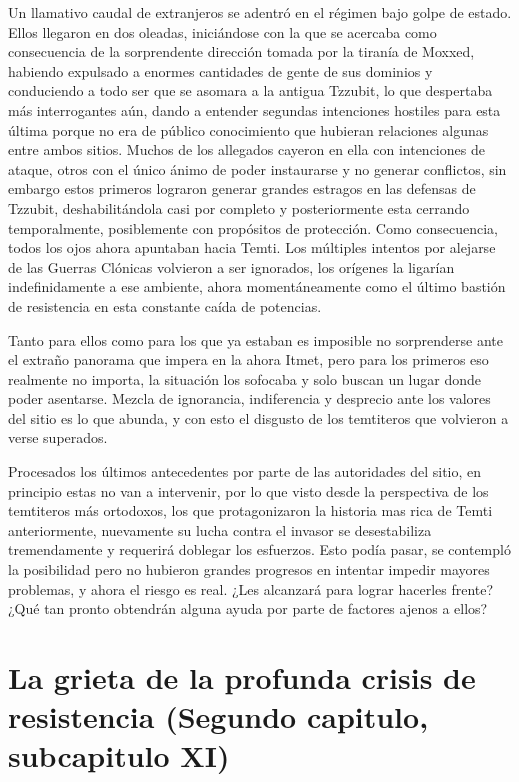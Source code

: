\documentclass[
  spanish,
]{book}
\begin{document}
Un llamativo caudal de extranjeros se adentró en el régimen bajo golpe de estado. Ellos llegaron en dos oleadas, iniciándose con la que se acercaba como consecuencia de la sorprendente dirección tomada por la tiranía de Moxxed, habiendo expulsado a enormes cantidades de gente de sus dominios y conduciendo a todo ser que se asomara a la antigua Tzzubit, lo que despertaba más interrogantes aún, dando a entender segundas intenciones hostiles para esta última porque no era de público conocimiento que hubieran relaciones algunas entre ambos sitios.
Muchos de los allegados cayeron en ella con intenciones de ataque, otros con el único ánimo de poder instaurarse y no generar conflictos, sin embargo estos primeros lograron generar grandes estragos en las defensas de Tzzubit, deshabilitándola casi por completo y posteriormente esta cerrando temporalmente, posiblemente con propósitos de protección. Como consecuencia, todos los ojos ahora apuntaban hacia Temti. Los múltiples intentos por alejarse de las Guerras Clónicas volvieron a ser ignorados, los orígenes la ligarían indefinidamente a ese ambiente, ahora momentáneamente como el último bastión de resistencia en esta constante caída de potencias.

Tanto para ellos como para los que ya estaban es imposible no sorprenderse ante el extraño panorama que impera en la ahora Itmet, pero para los primeros eso realmente no importa, la situación los sofocaba y solo buscan un lugar donde poder asentarse. Mezcla de ignorancia, indiferencia y desprecio ante los valores del sitio es lo que abunda, y con esto el disgusto de los temtiteros que volvieron a verse superados.

Procesados los últimos antecedentes por parte de las autoridades del sitio, en principio estas no van a intervenir, por lo que visto desde la perspectiva de los temtiteros más ortodoxos, los que protagonizaron la historia mas rica de Temti anteriormente, nuevamente su lucha contra el invasor se desestabiliza tremendamente y requerirá doblegar los esfuerzos. Esto podía pasar, se contempló la posibilidad pero no hubieron grandes progresos en intentar impedir mayores problemas, y ahora el riesgo es real. ¿Les alcanzará para lograr hacerles frente? ¿Qué tan pronto obtendrán alguna ayuda por parte de factores ajenos a ellos?

\hypertarget{la-grieta-de-la-profunda-crisis-de-resistencia-segundo-capitulo-subcapitulo-xi}{%
\section{La grieta de la profunda crisis de resistencia (Segundo capitulo, subcapitulo XI)}\label{la-grieta-de-la-profunda-crisis-de-resistencia-segundo-capitulo-subcapitulo-xi}}
\end{document}
